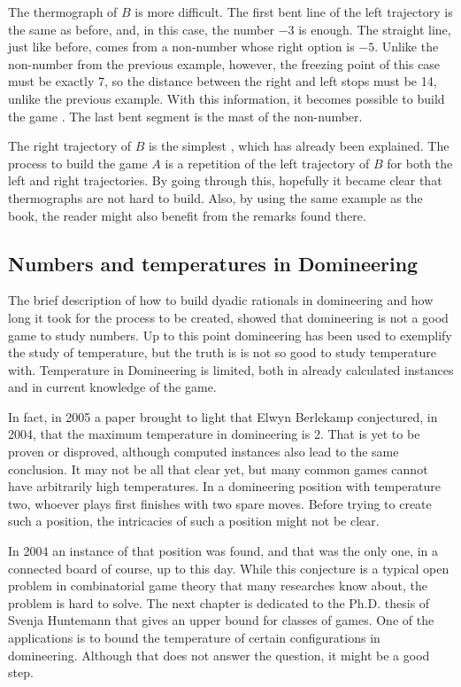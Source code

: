 The thermograph of $B$ is more difficult. The first bent line of the left trajectory is the same as before, and, in this case, the number ${-3}$ is enough. The straight line, just like before, comes from a non-number whose right option is ${-5}$. Unlike the non-number from the previous example, however, the freezing point of this case must be exactly 7, so the distance between the right and left stops must be 14, unlike the previous example. With this information, it becomes possible to build the game . The last bent segment is the mast of the non-number.

The right trajectory of $B$ is the simplest , which has already been explained. The process to build the game $A$ is a repetition of the left trajectory of $B$ for both the left and right trajectories. By going through this, hopefully it became clear that thermographs are not hard to build. Also, by using the same example as the book, the reader might also benefit from the remarks found there.

\subsection{Numbers and temperatures in Domineering}

The brief description of how to build dyadic rationals in domineering and how long it took for the process to be created, showed that domineering is not a good game to study numbers. Up to this point domineering has been used to exemplify the study of temperature, but the truth is is not so good to study temperature with. Temperature in Domineering is limited, both in already calculated instances and in current knowledge of the game.

In fact, in 2005 a paper \cite{12} brought to light that Elwyn Berlekamp conjectured, in 2004, that the maximum temperature in domineering is 2. That is yet to be proven or disproved, although computed instances also lead to the same conclusion. It may not be all that clear yet, but many common games cannot have arbitrarily high temperatures. In a domineering position with temperature two, whoever plays first finishes with two spare moves. Before trying to create such a position, the intricacies of such a position might not be clear.

In 2004 an instance of that position was found, and that was the only one, in a connected board of course, up to this day. While this conjecture is a typical open problem in combinatorial game theory that many researches know about, the problem is hard to solve. The next chapter is dedicated to the Ph.D. thesis of Svenja Huntemann \cite{5} that gives an upper bound for classes of games. One of the applications is to bound the temperature of certain configurations in domineering. Although that does not answer the question, it might be a good step.

